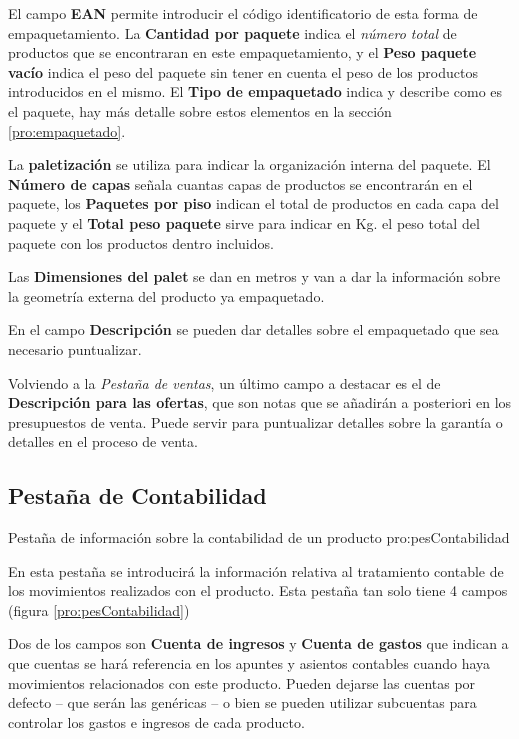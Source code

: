 El campo \textbf{EAN} permite introducir el código identificatorio de esta forma de empaquetamiento. La \textbf{Cantidad por paquete} indica el \emph{número total} de productos que se encontraran en este empaquetamiento, y el \textbf{Peso paquete vacío} indica el peso del paquete sin tener en cuenta el peso de los productos introducidos en el mismo. El \textbf{Tipo de empaquetado} indica y describe como es el paquete, hay más detalle sobre estos elementos en la sección \ref{pro:empaquetado}.

La \textbf{paletización} se utiliza para indicar la organización interna del paquete. El \textbf{Número de capas} señala cuantas capas de productos se encontrarán en el paquete, los \textbf{Paquetes por piso} indican el total de productos en cada capa del paquete y el \textbf{Total peso paquete} sirve para indicar en Kg. el peso total del paquete con los productos dentro incluidos.

Las \textbf{Dimensiones del palet} se dan en metros y van a dar la información sobre la geometría externa del producto ya empaquetado.

En el campo \textbf{Descripción} se pueden dar detalles sobre el empaquetado que sea necesario puntualizar.


Volviendo a la \emph{Pestaña de ventas}, un último campo a destacar es el de \textbf{Descripción para las ofertas}, que son notas que se añadirán a posteriori en los presupuestos de venta. Puede servir para puntualizar detalles sobre la garantía o detalles en el proceso de venta.




\subsection{Pestaña de Contabilidad}
{Pestaña de información sobre la contabilidad de un producto}
{pro:pesContabilidad}

En esta pestaña se introducirá la información relativa al tratamiento contable de los movimientos realizados con el producto. Esta pestaña tan solo tiene 4 campos (figura \ref{pro:pesContabilidad})

Dos de los campos son \textbf{Cuenta de ingresos} y \textbf{Cuenta de gastos} que indican a que cuentas se hará referencia en los apuntes y asientos contables cuando haya movimientos relacionados con este producto. Pueden dejarse las cuentas por defecto -- que serán las genéricas -- o bien se pueden utilizar subcuentas para controlar los gastos e ingresos de cada producto.

